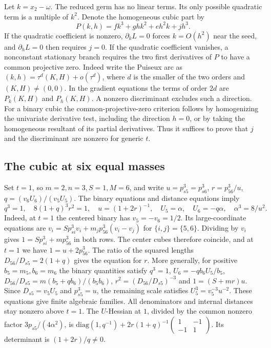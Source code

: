 \documentclass[11pt,letterpaper]{article}
\theoremstyle{definition}
\begin{document}
Let $k=x_2-\omega$. The reduced germ has no linear terms. Its only possible quadratic term is a multiple of $k^2$. Denote the homogeneous cubic part by
\[
P(k,h)=f k^3+g hk^2+e h^2k+jh^3.
\]
If the quadratic coefficient is nonzero, $\partial_kL=0$ forces $k=O(h^2)$ near the seed, and $\partial_hL=0$ then requires $j=0$. If the quadratic coefficient vanishes, a nonconstant stationary branch requires the two first derivatives of $P$ to have a common projective zero. Indeed write the Puiseux arc as $(k,h)=\tau^d(K,H)+o(\tau^d)$, where $d$ is the smaller of the two orders and $(K,H)\ne(0,0)$. In the gradient equations the terms of order $2d$ are $P_k(K,H)$ and $P_h(K,H)$. A nonzero discriminant excludes such a direction. For a binary cubic the common-projective-zero criterion follows by homogenizing the univariate derivative test, including the direction $h=0$, or by taking the homogeneous resultant of its partial derivatives. Thus it suffices to prove that $j$ and the discriminant are nonzero for generic $t$.

\subsection{The cubic at six equal masses}

Set $t=1$, so $m=2,n=3,S=1,M=6$, and write $u=p_{s5}^3=p_{s6}^3$, $r=p_{56}^3/u$, $q=(v_6 U_6)/(v_5 U_5)$. The binary equations and distance equations imply
\[
q^3=1,\quad 8(1+q)^3 r^2=1,\quad u=(1+2r)^{-1},
\quad U_5=\alpha,\quad U_6=-q\alpha,\quad \alpha^3=8/u^2.
\]
Indeed, at $t=1$ the centered binary has $v_5=-v_6=1/2$. Its large-coordinate equations are $v_i=S p_{si}^3 v_i+m_jp_{56}^3(v_i-v_j)$ for $\{i,j\}=\{5,6\}$. Dividing by $v_i$ gives $1=S p_{si}^3+mp_{56}^3$ in both rows. The center cubes therefore coincide, and at $t=1$ we have $1=u+2p_{56}^3$. The ratio of the squared lengths $D_{56}/D_{s5}=2(1+q)$ gives the equation for $r$. More generally, for positive $b_5=m_5,b_6=m_6$ the binary quantities satisfy $q^3=1$, $U_6=-q b_6 U_5/b_5$, $D_{56}/D_{s5}=m(b_5+q b_6)/(b_5 b_6)$, $r^2=(D_{56}/D_{s5})^{-3}$ and $1=(S+mr)u$. Since $D_{s5}=v_5 U_5$ and $p_{s5}^3=u$, the remaining scale satisfies $U_5^3=v_5^{-3}u^{-2}$. These equations give finite algebraic families. All denominators and internal distances stay nonzero above $t=1$. The $U$-Hessian at $1$, divided by the common nonzero factor $3p_{s5}/(4\alpha^2)$, is $\mathrm{diag}(1,q^{-1})+2r(1+q)^{-1}\left(\begin{smallmatrix}1&-1\\-1&1\end{smallmatrix}\right)$. Its determinant is $(1+2r)/q\ne0$.
\end{document}
